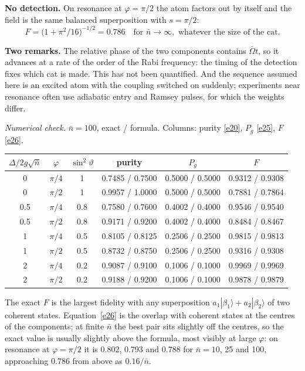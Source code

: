 \documentclass[11pt,letterpaper]{article}
\newcommand{\nbar}{\bar{n}}
\newcommand{\Obar}{\bar{\Omega}}
\newcommand{\ket}[1]{|#1\rangle}
\newcommand{\numcheck}[1]{\par{\small\textit{Numerical check.} #1}\par}
\begin{document}
\textbf{No detection.} On resonance at $\varphi=\pi/2$ the atom factors out by itself and the field is
the same balanced superposition with $s=\pi/2$:
\begin{equation}\label{e27}
F=\bigl(1+\pi^2/16\bigr)^{-1/2}=0.786\quad\text{for }\nbar\to\infty,\text{ whatever the size of the cat}.
\end{equation}

\textbf{Two remarks.} The relative phase of the two components contains $\Obar t$, so it advances
at a rate of the order of the Rabi frequency: the timing of the detection fixes which cat is made.
This has not been quantified. And the sequence assumed here is an excited atom with the coupling
switched on suddenly; experiments near resonance often use adiabatic entry and Ramsey pulses,
for which the weights differ.
\numcheck{$\nbar=100$, exact / formula. Columns: purity \eqref{e20}, $P_g$ \eqref{e25}, $F$ \eqref{e26}.}
\begin{center}\small
\begin{tabular}{@{}cccccc@{}}
\toprule
$\Delta/2g\sqrt{\nbar}$ & $\varphi$ & $\sin^2\vartheta$ & purity & $P_g$ & $F$\\
\midrule
0 & $\pi/4$ & 1 & 0.7485 / 0.7500 & 0.5000 / 0.5000 & 0.9312 / 0.9308\\
0 & $\pi/2$ & 1 & 0.9957 / 1.0000 & 0.5000 / 0.5000 & 0.7881 / 0.7864\\
0.5 & $\pi/4$ & 0.8 & 0.7580 / 0.7600 & 0.4002 / 0.4000 & 0.9546 / 0.9540\\
0.5 & $\pi/2$ & 0.8 & 0.9171 / 0.9200 & 0.4002 / 0.4000 & 0.8484 / 0.8467\\
1 & $\pi/4$ & 0.5 & 0.8105 / 0.8125 & 0.2506 / 0.2500 & 0.9815 / 0.9813\\
1 & $\pi/2$ & 0.5 & 0.8732 / 0.8750 & 0.2506 / 0.2500 & 0.9316 / 0.9308\\
2 & $\pi/4$ & 0.2 & 0.9087 / 0.9100 & 0.1006 / 0.1000 & 0.9969 / 0.9969\\
2 & $\pi/2$ & 0.2 & 0.9188 / 0.9200 & 0.1006 / 0.1000 & 0.9878 / 0.9879\\
\bottomrule
\end{tabular}
\end{center}
The exact $F$ is the largest fidelity with any superposition $a_1\ket{\beta_1}+a_2\ket{\beta_2}$ of two
coherent states. Equation~\eqref{e26} is the overlap with coherent states at the centres of the
components; at finite $\nbar$ the best pair sits slightly off the centres, so the exact value is
usually slightly above the formula, most visibly at large $\varphi$: on resonance at $\varphi=\pi/2$ it is 0.802, 0.793
and 0.788 for $\nbar=10$, 25 and 100, approaching 0.786 from above as $0.16/\nbar$.
\end{document}
